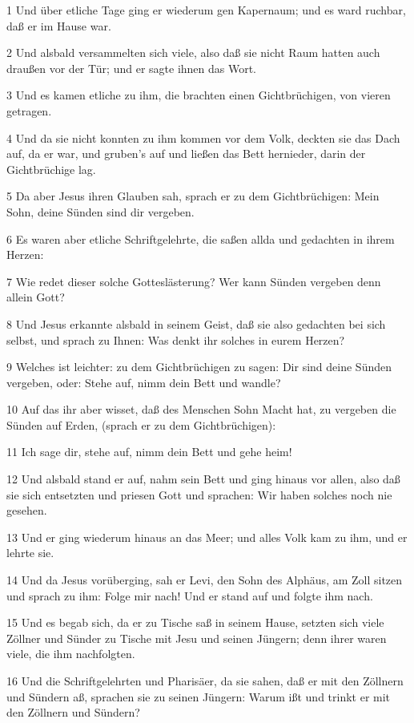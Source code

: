\par 1 Und über etliche Tage ging er wiederum gen Kapernaum; und es ward ruchbar, daß er im Hause war.
\par 2 Und alsbald versammelten sich viele, also daß sie nicht Raum hatten auch draußen vor der Tür; und er sagte ihnen das Wort.
\par 3 Und es kamen etliche zu ihm, die brachten einen Gichtbrüchigen, von vieren getragen.
\par 4 Und da sie nicht konnten zu ihm kommen vor dem Volk, deckten sie das Dach auf, da er war, und gruben's auf und ließen das Bett hernieder, darin der Gichtbrüchige lag.
\par 5 Da aber Jesus ihren Glauben sah, sprach er zu dem Gichtbrüchigen: Mein Sohn, deine Sünden sind dir vergeben.
\par 6 Es waren aber etliche Schriftgelehrte, die saßen allda und gedachten in ihrem Herzen:
\par 7 Wie redet dieser solche Gotteslästerung? Wer kann Sünden vergeben denn allein Gott?
\par 8 Und Jesus erkannte alsbald in seinem Geist, daß sie also gedachten bei sich selbst, und sprach zu Ihnen: Was denkt ihr solches in eurem Herzen?
\par 9 Welches ist leichter: zu dem Gichtbrüchigen zu sagen: Dir sind deine Sünden vergeben, oder: Stehe auf, nimm dein Bett und wandle?
\par 10 Auf das ihr aber wisset, daß des Menschen Sohn Macht hat, zu vergeben die Sünden auf Erden, (sprach er zu dem Gichtbrüchigen):
\par 11 Ich sage dir, stehe auf, nimm dein Bett und gehe heim!
\par 12 Und alsbald stand er auf, nahm sein Bett und ging hinaus vor allen, also daß sie sich entsetzten und priesen Gott und sprachen: Wir haben solches noch nie gesehen.
\par 13 Und er ging wiederum hinaus an das Meer; und alles Volk kam zu ihm, und er lehrte sie.
\par 14 Und da Jesus vorüberging, sah er Levi, den Sohn des Alphäus, am Zoll sitzen und sprach zu ihm: Folge mir nach! Und er stand auf und folgte ihm nach.
\par 15 Und es begab sich, da er zu Tische saß in seinem Hause, setzten sich viele Zöllner und Sünder zu Tische mit Jesu und seinen Jüngern; denn ihrer waren viele, die ihm nachfolgten.
\par 16 Und die Schriftgelehrten und Pharisäer, da sie sahen, daß er mit den Zöllnern und Sündern aß, sprachen sie zu seinen Jüngern: Warum ißt und trinkt er mit den Zöllnern und Sündern?
